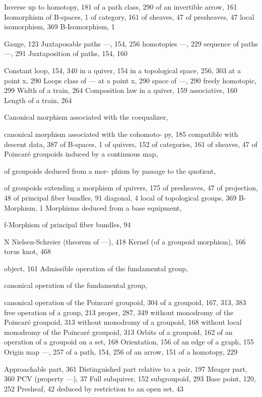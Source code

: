 Inverse up to homotopy, 181 of a path class, 290 of an invertible arrow, 161 Isomorphism of B-spaces, 1 of category, 161 of sheaves, 47 of presheaves, 47 local isomorphism, 369 B-Isomorphism, 1


Gauge, 123 Juxtaposable paths ---, 154, 256 homotopies ---, 229 sequence of paths ---, 291 Juxtaposition of paths, 154, 160


Constant loop, 154, 340 in a quiver, 154 in a topological space, 256, 303 at a point x, 290 Loops class of --- at a point x, 290 space of ---, 290 freely homotopic, 299 Width of a train, 264 Composition law in a quiver, 159 associative, 160 Length of a train, 264


Canonical morphism associated with the coequalizer,

canonical morphism associated with the cohomoto- py, 185 compatible with descent data, 387 of B-spaces, 1 of quivers, 152 of categories, 161 of sheaves, 47 of Poincaré groupoids induced by a continuous map,

of groupoids deduced from a mor- phism by passage to the quotient,

of groupoids extending a morphism of quivers, 175 of presheaves, 47 of projection, 48 of principal fiber bundles, 91 diagonal, 4 local of topological groups, 369 B-Morphism, 1 Morphisms deduced from a base equipment,

f-Morphism of principal fiber bundles, 94

N Nielsen-Schreier (theorem of ---), 418 Kernel (of a groupoid morphism), 166 torus knot, 468


object, 161 Admissible operation of the fundamental group,

canonical operation of the fundamental group,

canonical operation of the Poincaré groupoid, 304 of a groupoid, 167, 313, 383 free operation of a group, 213 proper, 287, 349 without monodromy of the Poincaré groupoid, 313 without monodromy of a groupoid, 168 without local monodromy of the Poincaré groupoid, 313 Orbits of a groupoid, 162 of an operation of a groupoid on a set, 168 Orientation, 156 of an edge of a graph, 155 Origin map ---, 257 of a path, 154, 256 of an arrow, 151 of a homotopy, 229


Approachable part, 361 Distinguished part relative to a pair, 197 Meager part, 360 PCV (property ---), 37 Full subquiver, 152 subgroupoid, 293 Base point, 120, 252 Presheaf, 42 deduced by restriction to an open set, 43

